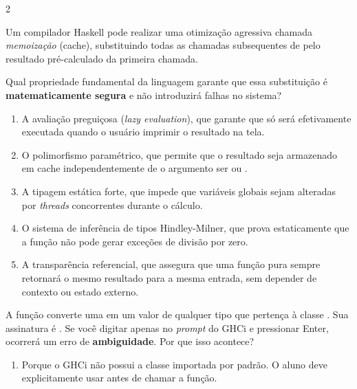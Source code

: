 \documentclass[a4paper,10pt,brazil]{article}
\begin{document}
\begin{multicols}{2}
\begin{enumerate}
\end{enumerate}

Um compilador Haskell pode realizar uma otimização agressiva chamada \emph{memoização} (cache), substituindo todas as chamadas subsequentes de  pelo resultado pré-calculado da primeira chamada. 

Qual propriedade fundamental da linguagem garante que essa substituição é \textbf{matematicamente segura} e não introduzirá falhas no sistema?

\begin{enumerate}
  \item A avaliação preguiçosa (\emph{lazy evaluation}), que garante que  só será efetivamente executada quando o usuário imprimir o resultado na tela.

  \item O polimorfismo paramétrico, que permite que o resultado seja armazenado em cache independentemente de o argumento ser  ou .

  \item A tipagem estática forte, que impede que variáveis globais sejam alteradas por \textit{threads} concorrentes durante o cálculo.

  \item O sistema de inferência de tipos Hindley-Milner, que prova estaticamente que a função não pode gerar exceções de divisão por zero.

  \item A transparência referencial, que assegura que uma função pura sempre retornará o mesmo resultado para a mesma entrada, sem depender de contexto ou estado externo.


\end{enumerate}

A função  converte uma  em um valor de qualquer tipo que pertença à classe . Sua assinatura é . 
Se você digitar apenas  no \emph{prompt} do GHCi e pressionar Enter, ocorrerá um erro de \textbf{ambiguidade}. Por que isso acontece?

\begin{enumerate}
  \item Porque o GHCi não possui a classe  importada por padrão. O aluno deve explicitamente usar  antes de chamar a função.


\end{enumerate}
\end{multicols}
\end{document}
